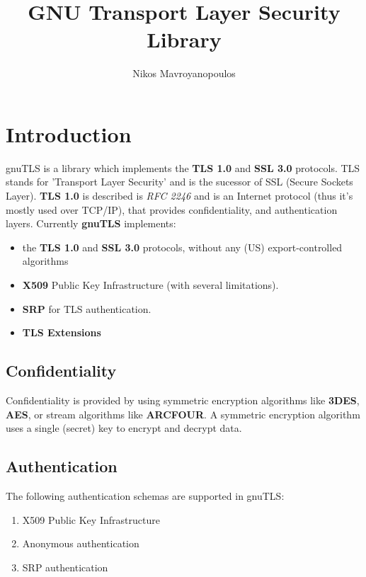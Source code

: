 \documentclass{article}
\begin{document}
\title{GNU Transport Layer Security Library}
\author{Nikos Mavroyanopoulos}
\maketitle

\tableofcontents

\section{Introduction}
\par
gnuTLS is a library which implements the {\bf TLS 1.0} and {\bf SSL 3.0} protocols.
TLS stands for 'Transport Layer Security' and is the sucessor of SSL (Secure Sockets Layer).
{\bf TLS 1.0} is described is {\it RFC 2246} and is an Internet protocol (thus it's mostly used over TCP/IP),
that provides confidentiality, and authentication layers. Currently {\bf gnuTLS} implements:
\begin{itemize}
 \item the {\bf TLS 1.0} and {\bf{ SSL 3.0}} protocols, without any (US) export-controlled algorithms
 \item {\bf X509} Public Key Infrastructure (with several limitations).
 \item {\bf SRP} for TLS authentication.
 \item {\bf TLS Extensions}
\end{itemize}

\subsection{Confidentiality}
\par
Confidentiality is provided by using symmetric encryption algorithms like {\bf 3DES}, {\bf AES}, or
stream algorithms like {\bf ARCFOUR}. A symmetric encryption algorithm uses a single (secret) key
to encrypt and decrypt data.

\subsection{Authentication}
\par
The following authentication schemas are supported in gnuTLS:
\begin{enumerate}
 \item X509 Public Key Infrastructure
 \item Anonymous authentication
 \item SRP authentication
\end{enumerate}
\end{document}
